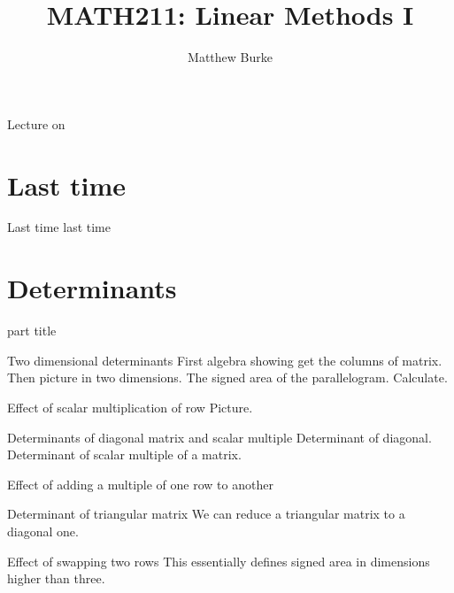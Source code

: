 \documentclass{beamer}
\title{MATH211: Linear Methods I}
\author{Matthew Burke}
\date{\lectureDate}
\newcommand{\lectureDate}{\formatdate{27}{09}{2018}}
\begin{document}
\frame{\titlepage}

\begin{frame}{Lecture on \lectureDate}
  \tableofcontents
\end{frame}

\section*{Last time}
\label{sec:Last-time}

\begin{frame}{Last time}
  last time
\end{frame}

\section{Determinants}

\begin{frame}
  \begin{beamercolorbox}[sep=12pt,center]{part title}
    \insertsection\par
  \end{beamercolorbox}
\end{frame}

\begin{frame}{Two dimensional determinants}
  First algebra showing get the columns of matrix.
  Then picture in two dimensions.
  The signed area of the parallelogram.
  Calculate.
\end{frame}

\begin{frame}{Effect of scalar multiplication of row}
  Picture.
\end{frame}

\begin{frame}{Determinants of diagonal matrix and scalar multiple}
  Determinant of diagonal.
  Determinant of scalar multiple of a matrix.
\end{frame}

\begin{frame}{Effect of adding a multiple of one row to another}
  
\end{frame}

\begin{frame}{Determinant of triangular matrix}
  We can reduce a triangular matrix to a diagonal one.
\end{frame}

\begin{frame}{Effect of swapping two rows}
  This essentially defines signed area in dimensions higher than three.
\end{frame}
\end{document}
